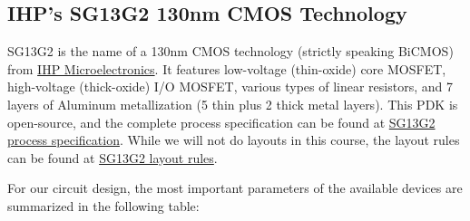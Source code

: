 \documentclass[
  a4paper,
  DIV=11,
  numbers=noendperiod]{scrartcl}
\begin{document}
\subsection{IHP's SG13G2 130nm CMOS
Technology}\label{ihps-sg13g2-130nm-cmos-technology}

SG13G2 is the name of a 130nm CMOS technology (strictly speaking BiCMOS)
from \href{https://www.ihp-microelectronics.com}{IHP Microelectronics}.
It features low-voltage (thin-oxide) core MOSFET, high-voltage
(thick-oxide) I/O MOSFET, various types of linear resistors, and 7
layers of Aluminum metallization (5 thin plus 2 thick metal layers).
This PDK is open-source, and the complete process specification can be
found at
\href{https://github.com/IHP-GmbH/IHP-Open-PDK/blob/main/ihp-sg13g2/libs.doc/doc/SG13G2_os_process_spec.pdf}{SG13G2
process specification}. While we will not do layouts in this course, the
layout rules can be found at
\href{https://github.com/IHP-GmbH/IHP-Open-PDK/blob/main/ihp-sg13g2/libs.doc/doc/SG13G2_os_layout_rules.pdf}{SG13G2
layout rules}.

For our circuit design, the most important parameters of the available
devices are summarized in the following table:
\end{document}
